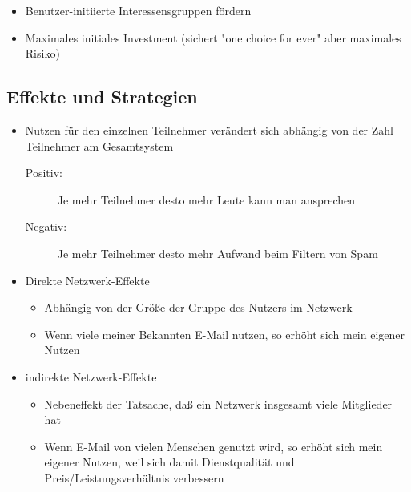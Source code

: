 \documentclass{article} %
\begin{document}
	\begin{itemize}
		\item Benutzer-initiierte Interessensgruppen fördern
		\item Maximales initiales Investment (sichert "one choice for ever" aber maximales Risiko)
	\end{itemize}
	\subsection{Effekte und Strategien}
	\begin{itemize}
		\item Nutzen für den einzelnen Teilnehmer verändert sich
abhängig von der Zahl Teilnehmer am Gesamtsystem
		\begin{description}
			\item[Positiv:] Je mehr Teilnehmer desto mehr Leute kann man ansprechen
			\item[Negativ:] Je mehr Teilnehmer desto mehr Aufwand beim Filtern von Spam
		\end{description}
		\item Direkte Netzwerk-Effekte
		\begin{itemize}
			\item Abhängig von der Größe der Gruppe des Nutzers im Netzwerk
			\item Wenn viele meiner Bekannten E-Mail nutzen, so erhöht sich mein eigener Nutzen
		\end{itemize}
		\item indirekte Netzwerk-Effekte
		\begin{itemize}
			\item Nebeneffekt der Tatsache, daß ein Netzwerk
insgesamt viele Mitglieder hat
			\item Wenn E-Mail von vielen Menschen genutzt wird, so erhöht
sich mein eigener Nutzen, weil sich damit Dienstqualität und
Preis/Leistungsverhältnis verbessern
		\end{itemize}
	\end{itemize}
\end{document}
